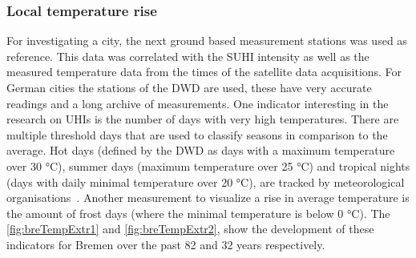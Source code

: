\documentclass[12pt,a4paper, english,twoside]{scrartcl}
\begin{document}
    \subsubsection{Local temperature rise}
      For investigating a city, the next ground based measurement stations was used as reference. 
      This data was correlated with the \gls{SUHI} intensity as well as the measured temperature data from the times of the satellite data acquisitions. 
      For German cities the stations of the \gls{DWD} are used, these have very accurate readings and a long archive of measurements.
      One indicator interesting in the research on \glspl{UHI} is the number of days with very high temperatures.
      There are multiple threshold days that are used to classify seasons in comparison to the average.
      Hot days (defined by the \gls{DWD} as days with a maximum temperature over 30 °C), summer days (maximum temperature over 25 °C) and tropical nights (days with daily minimal temperature over 20 °C), are tracked by meteorological organisations~\autocite{dwdklimalexikon}.
      Another measurement to visualize a rise in average temperature is the amount of frost days (where the minimal temperature is below 0 °C). The \cref{fig:breTempExtr1} and \cref{fig:breTempExtr2}, show the development of these indicators for Bremen over the past 82 and 32 years respectively.
\end{document}
